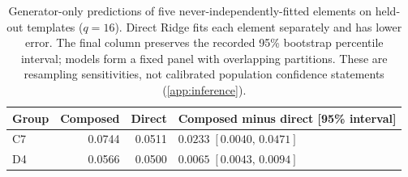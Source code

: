 \begin{table}[t]
\caption{Generator-only predictions of five never-independently-fitted elements on held-out templates ($q=16$). Direct Ridge fits each element separately and has lower error. The final column preserves the recorded 95\% bootstrap percentile interval; models form a fixed panel with overlapping partitions. These are resampling sensitivities, not calibrated population confidence statements (\cref{app:inference}).}
\label{tab:generator-transfer}
\centering
\small
\begin{tabular}{lrrl}
\toprule
Group & Composed & Direct & Composed minus direct [95\% interval] \\
\midrule
C7 & 0.0744 & 0.0511 & $0.0233\;[0.0040,\,0.0471]$ \\
D4 & 0.0566 & 0.0500 & $0.0065\;[0.0043,\,0.0094]$ \\
\bottomrule
\end{tabular}
\end{table}
